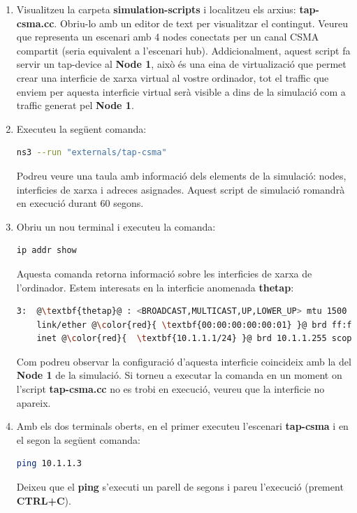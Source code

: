 \documentclass[12pt,a4paper]{article}
\begin{document}
\begin{enumerate}
\item Visualitzeu la carpeta \textbf{simulation-scripts} i localitzeu els arxius: \textbf{tap-csma.cc}. Obriu-lo amb un editor de text per visualitzar el contingut.
Veureu que representa un escenari amb 4 nodes conectats per un canal CSMA compartit (seria equivalent a l'escenari hub).
\newline
Addicionalment, aquest script fa servir un tap-device al \textbf{Node 1}, això és una eina de virtualizació 
que permet crear una interficie de xarxa virtual al vostre ordinador, tot el traffic que enviem per aquesta interficie virtual
serà visible a dins de la simulació com a traffic generat pel \textbf{Node 1}.
\item Executeu la següent comanda: 
\begin{lstlisting}[language=bash]
ns3 --run "externals/tap-csma" 
\end{lstlisting}
Podreu veure una taula amb informació dels elements de la simulació: nodes, interficies de xarxa i adreces asignades. 
Aquest script de simulació romandrà en execució durant 60 segons.
\item Obriu un nou terminal i executeu la comanda:
\begin{lstlisting}[language=bash]
ip addr show
\end{lstlisting}
Aquesta comanda retorna informació sobre les interficies de xarxa de l'ordinador. Estem interesats en la interficie anomenada \textbf{thetap}:
\begin{lstlisting}[escapechar=@,language=bash,basicstyle=\footnotesize]
3:  @\textbf{thetap}@ : <BROADCAST,MULTICAST,UP,LOWER_UP> mtu 1500 qdisc fq_codel 
    link/ether @\color{red}{ \textbf{00:00:00:00:00:01} }@ brd ff:ff:ff:ff:ff:ff
    inet @\color{red}{  \textbf{10.1.1.1/24} }@ brd 10.1.1.255 scope global thetap
\end{lstlisting}
Com podreu observar la configuració d'aquesta interficie coincideix amb la del \textbf{Node 1} de la simulació.
Si torneu a executar la comanda en un moment on l'script \textbf{tap-csma.cc} no es trobi en execució,
veureu que la interficie no apareix.

\item Amb els dos terminals oberts, en el primer executeu l'escenari  \textbf{tap-csma} i en el segon la següent comanda:
\begin{lstlisting}[language=bash]
ping 10.1.1.3
\end{lstlisting}
Deixeu que el \textbf{ping} s'executi un parell de segons i pareu l'execució (prement \textbf{CTRL+C}).


\end{enumerate}
\end{document}
